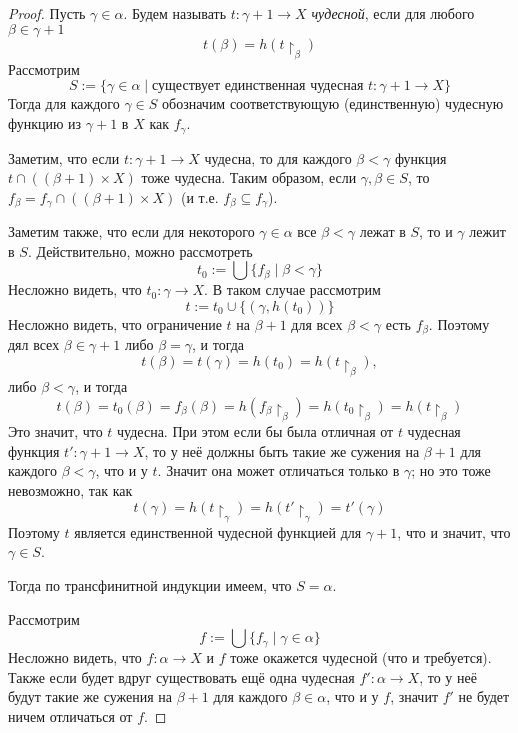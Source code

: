 \documentclass[12pt,a4paper]{article}
\begin{document}
    \begin{proof}
        Пусть $\gamma \in \alpha$. Будем называть $t: \gamma + 1 \to X$ \emph{чудесной}, если для любого $\beta \in \gamma + 1$
        \[t(\beta) = h(t \upharpoonright_\beta)\]
        Рассмотрим
        \[S := \{\gamma \in \alpha \mid \text{существует единственная чудесная $t: \gamma + 1 \to X$}\}\]
        Тогда для каждого $\gamma \in S$ обозначим соответствующую (единственную) чудесную функцию из $\gamma + 1$ в $X$ как $f_\gamma$.

        Заметим, что если $t: \gamma + 1 \to X$ чудесна, то для каждого $\beta < \gamma$ функция $t \cap ((\beta + 1) \times X)$ тоже чудесна. Таким образом, если $\gamma, \beta \in S$, то $f_\beta = f_\gamma \cap ((\beta + 1) \times X)$ (и т.е. $f_\beta \subseteq f_\gamma$).

        Заметим также, что если для некоторого $\gamma \in \alpha$ все $\beta < \gamma$ лежат в $S$, то и $\gamma$ лежит в $S$. Действительно, можно рассмотреть
        \[t_0 := \bigcup \{f_\beta \mid \beta < \gamma\}\]
        Несложно видеть, что $t_0: \gamma \to X$. В таком случае рассмотрим
        \[t := t_0 \cup \{(\gamma, h(t_0))\}\]
        Несложно видеть, что ограничение $t$ на $\beta + 1$ для всех $\beta < \gamma$ есть $f_\beta$. Поэтому дял всех $\beta \in \gamma + 1$ либо $\beta = \gamma$, и тогда
        \[t(\beta) = t(\gamma) = h(t_0) = h(t \upharpoonright_\beta),\]
        либо $\beta < \gamma$, и тогда
        \[t(\beta) = t_0(\beta) = f_\beta(\beta) = h(f_\beta \upharpoonright_\beta) = h(t_0 \upharpoonright_\beta) = h(t \upharpoonright_\beta)\]
        Это значит, что $t$ чудесна. При этом если бы была отличная от $t$ чудесная функция $t': \gamma + 1 \to X$, то у неё должны быть такие же сужения на $\beta + 1$ для каждого $\beta < \gamma$, что и у $t$. Значит она может отличаться только в $\gamma$; но это тоже невозможно, так как
        \[t(\gamma) = h(t \upharpoonright_\gamma) = h(t' \upharpoonright_\gamma) = t'(\gamma)\]
        Поэтому $t$ является единственной чудесной функцией для $\gamma + 1$, что и значит, что $\gamma \in S$.

        Тогда по трансфинитной индукции имеем, что $S = \alpha$.

        Рассмотрим
        \[f := \bigcup \{f_\gamma \mid \gamma \in \alpha\}\]
        Несложно видеть, что $f: \alpha \to X$ и $f$ тоже окажется чудесной (что и требуется). Также если будет вдруг существовать ещё одна чудесная $f': \alpha \to X$, то у неё будут такие же сужения на $\beta + 1$ для каждого $\beta \in \alpha$, что и у $f$, значит $f'$ не будет ничем отличаться от $f$.
    \end{proof}
\end{document}
